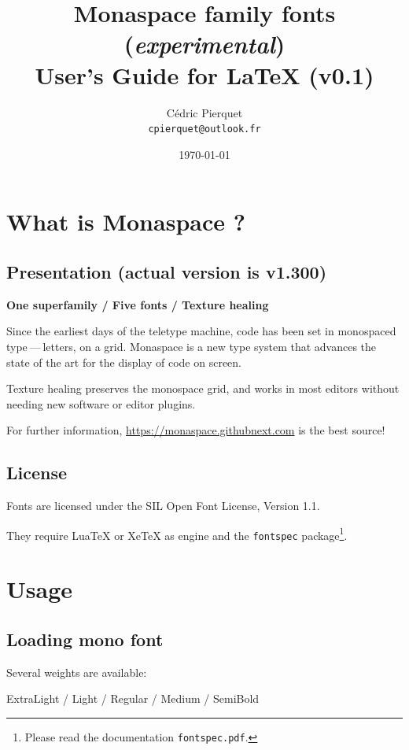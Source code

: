 \documentclass[a4paper]{scrartcl}
\title{Monaspace family fonts (\textit{experimental}) \\User’s Guide for LaTeX (v0.1)}
\author{Cédric Pierquet \\ \texttt{cpierquet@outlook.fr}}
\date{\today}
\newcommand*{\pkg}[1]{\texttt{#1}}
\newcommand*{\file}[1]{\texttt{#1}}
\begin{document}
\maketitle

\section{What is Monaspace ?}

\subsection{Presentation (actual version is v1.300)}

\textbf{One superfamily / Five fonts / Texture healing}

Since the earliest days of the teletype machine, code has been set in monospaced type — letters, on a grid. Monaspace is a new type system that advances the state of the art for the display of code on screen.

Texture healing preserves the monospace grid, and works in most editors without needing new software or editor plugins.

\medskip

For further information, \url{https://monaspace.githubnext.com} is the best source!

\subsection{License}

Fonts are licensed under the SIL Open Font License, Version 1.1.

They require LuaTeX or XeTeX as engine and the \pkg{fontspec} package\footnote{Please read the documentation \file{fontspec.pdf}.}.

\pagebreak

\section{Usage}

\subsection{Loading mono font}

Several weights are available:

\hfill{\monaspaceargonextralight ExtraLight} / {\monaspaceargonlight Light} / {\monaspaceargon Regular} / {\monaspaceargonmedium Medium} / {\monaspaceargonsemibold SemiBold}\hfill\null
\end{document}
